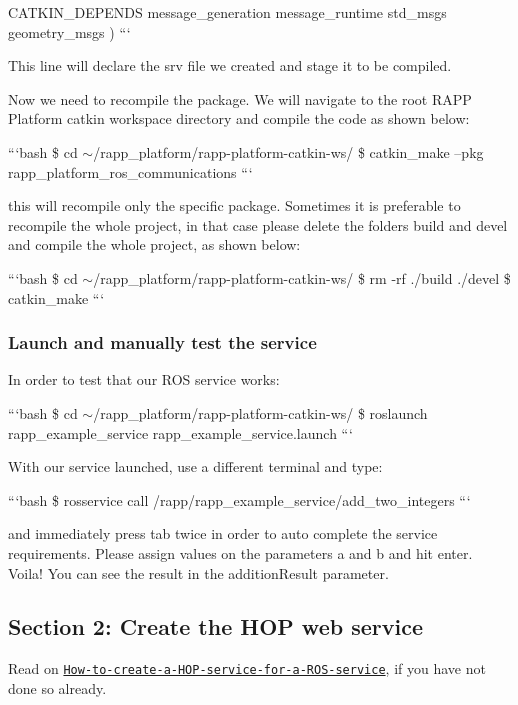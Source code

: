 C\-A\-T\-K\-I\-N\-\_\-\-D\-E\-P\-E\-N\-D\-S message\-\_\-generation message\-\_\-runtime std\-\_\-msgs geometry\-\_\-msgs ) ```

This line will declare the srv file we created and stage it to be compiled.

Now we need to recompile the package. We will navigate to the root R\-A\-P\-P Platform catkin workspace directory and compile the code as shown below\-:

```bash \$ cd $\sim$/rapp\-\_\-platform/rapp-\/platform-\/catkin-\/ws/ \$ catkin\-\_\-make --pkg rapp\-\_\-platform\-\_\-ros\-\_\-communications ```

this will recompile only the specific package. Sometimes it is preferable to recompile the whole project, in that case please delete the folders build and devel and compile the whole project, as shown below\-:

```bash \$ cd $\sim$/rapp\-\_\-platform/rapp-\/platform-\/catkin-\/ws/ \$ rm -\/rf ./build ./devel \$ catkin\-\_\-make ```

\subsubsection*{Launch and manually test the service}

In order to test that our R\-O\-S service works\-:

```bash \$ cd $\sim$/rapp\-\_\-platform/rapp-\/platform-\/catkin-\/ws/ \$ roslaunch rapp\-\_\-example\-\_\-service rapp\-\_\-example\-\_\-service.\-launch ```

With our service launched, use a different terminal and type\-:

```bash \$ rosservice call /rapp/rapp\-\_\-example\-\_\-service/add\-\_\-two\-\_\-integers ```

and immediately press tab twice in order to auto complete the service requirements. Please assign values on the parameters a and b and hit enter. Voila! You can see the result in the addition\-Result parameter.

\subsection*{Section 2\-: Create the H\-O\-P web service}

Read on \href{https://github.com/rapp-project/rapp-platform/wiki/How-to-create-a-HOP-service-for-a-ROS-service%3F}{\tt How-\/to-\/create-\/a-\/\-H\-O\-P-\/service-\/for-\/a-\/\-R\-O\-S-\/service}, if you have not done so already.

